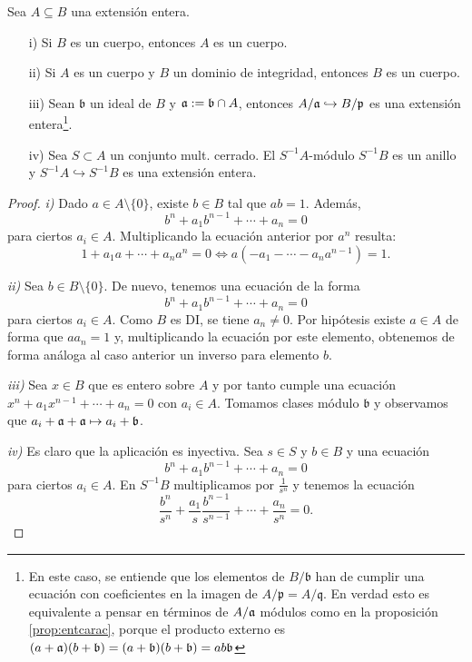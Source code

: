 \documentclass[../main.tex]{subfiles}
\begin{document}
\begin{proposition}\label{props_entera}Sea $A\subseteq B$ una extensión entera.
\begin{itemize}
    \item[i)] Si $B$ es un cuerpo, entonces $A$ es un cuerpo.
    \item[ii)] Si $A$ es un cuerpo y $B$ un dominio de integridad, entonces $B$ es un cuerpo.
    \item[iii)] Sean $\mathfrak{b}$ un ideal de $B$ y $\mathfrak{a}:=\mathfrak{b}\cap A$, entonces $A/\mathfrak{a}\hookrightarrow B/\mathfrak{p}$ es una extensión entera\footnote{En este caso, se entiende que los elementos de $B/\mathfrak{b}$ han de cumplir una ecuación con coeficientes en la imagen de $A/\mathfrak{p} = A/\mathfrak{q}$. En verdad esto es equivalente a pensar en términos de $A/\mathfrak{a}$ módulos como en la proposición \ref{prop:entcarac}, porque el producto externo es $(a+\mathfrak{a})(b+\mathfrak{b}) =(a+\mathfrak{b})(b+\mathfrak{b}) = ab \mathfrak{b} $}.
    \item[iv)] Sea $S\subset A$ un conjunto mult. cerrado. El $S^{-1}A$-módulo $S^{-1}B$ es un anillo y $S^{-1}A\hookrightarrow S^{-1}B$ es una extensión entera.
\end{itemize}
\end{proposition}
\begin{proof}
\textit{i)} Dado $a\in A\setminus\{0\}$, existe $b\in B $ tal que $ab=1.$ Además,
$$b^n+a_1b^{n-1}+\cdots+a_n=0$$
para ciertos $a_i\in A.$ Multiplicando la ecuación anterior por $a^n$ resulta:
$$1+a_1a+\cdots+a_na^n=0\Longleftrightarrow a(-a_1-\cdots-a_na^{n-1})=1.$$

\textit{ii)} Sea  $b\in B\setminus\{0\}.$ De nuevo, tenemos una ecuación de la forma
$$b^n+a_1b^{n-1}+\cdots+a_n=0$$
para ciertos $a_i\in A.$ Como $B$ es DI, se tiene $a_n\neq0.$ Por hipótesis existe $a\in A$ de forma que $aa_n=1$ y, multiplicando la ecuación por este elemento, obtenemos de forma análoga al caso anterior un inverso para elemento $b.$

\textit{iii)} Sea $x\in B$ que es entero sobre $A$ y por tanto cumple una ecuación $x^n+a_1x^{n-1}+\cdots+a_n=0$ con $a_i \in A$. Tomamos clases módulo $\mathfrak{b}$ y observamos que $a_i+ \mathfrak{a}+ \mathfrak{a} \mapsto a_i +\mathfrak{b}$.

\textit{iv)} Es claro que la aplicación es inyectiva. Sea $s\in S$ y $b\in B$ y una ecuación
$$b^n+a_1b^{n-1}+\cdots+a_n=0$$
para ciertos $a_i\in A.$ En $S^{-1}B$ multiplicamos por $\frac{1}{s^n}$ y tenemos la ecuación
$$\frac{b^n}{s^n}+\frac{a_1}{s}\frac{b^{n-1}}{s^{n-1}}+\cdots+\frac{a_n}{s^n}=0.$$
\end{proof}
\end{document}

